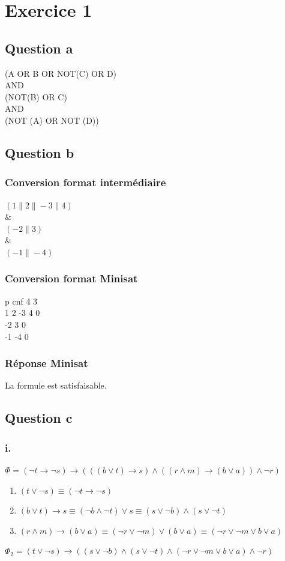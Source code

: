 \documentclass[12pt]{report}
\begin{document}
\section*{Exercice 1}
\subsection*{Question a}
(A OR B OR NOT(C) OR D) \\
AND\\
(NOT(B) OR C)\\
AND\\
(NOT (A) OR NOT (D))

\subsection*{Question b}
\subsubsection*{Conversion format intermédiaire}
$( 1\| 2 \| -3 \| 4 )$\\
\& \\
$( -2 \| 3 )$\\
\& \\
$( -1 \| -4 )$
\subsubsection*{Conversion format Minisat}
p cnf 4 3\\
1 2 -3 4 0\\
-2 3 0\\
-1 -4 0
\subsubsection*{Réponse Minisat}
La formule est satisfaisable.

\subsection*{Question c}
\subsubsection*{i.}
$\Phi = (\lnot t \rightarrow \lnot s) \rightarrow (((b \lor t) \rightarrow s) \land ((r \land m) \rightarrow (b \lor a))\land \lnot r)$ 
\begin{enumerate}
	\item $(t \lor \lnot s) \equiv (\lnot t \rightarrow \lnot s)$
	\item $(b \lor t) \rightarrow s \equiv (\lnot b \land \lnot t) \lor s \equiv (s\lor \lnot b) \land (s \lor \lnot t)$
	\item $(r \land m) \rightarrow (b \lor a) \equiv (\lnot r \lor \lnot m) \lor (b \lor a) \equiv (\lnot r \lor \lnot m \lor b \lor a)$
\end{enumerate}
$\Phi_2 = (t \lor \lnot s) \rightarrow ((s \lor \lnot b) \land (s \lor \lnot t) \land (\lnot r \lor \lnot m \lor b \lor a) \land \lnot r)$
\end{document}
